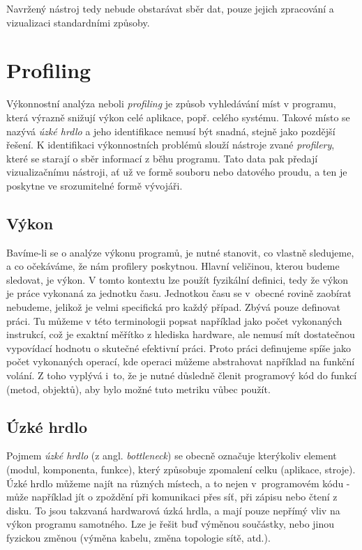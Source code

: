 \documentclass[czech,BP]{thesiskiv}
\begin{document}
Navržený nástroj tedy nebude obstarávat sběr dat, pouze jejich zpracování a vizualizaci standardními způsoby.

\newpage

\chapter{Profiling}

Výkonnostní analýza neboli \emph{profiling} je způsob vyhledávání míst v programu, která výrazně snižují výkon celé aplikace, popř. celého systému. Takové místo se nazývá \emph{úzké hrdlo} a jeho identifikace nemusí být snadná, stejně jako pozdější řešení. K identifikaci výkonnostních problémů slouží nástroje zvané \emph{profilery}, které se starají o sběr informací z běhu programu. Tato data pak předají vizualizačnímu nástroji, ať už ve formě souboru nebo datového proudu, a ten je poskytne ve srozumitelné formě vývojáři.

\section{Výkon}

Bavíme-li se o analýze výkonu programů, je nutné stanovit, co vlastně sledujeme, a co očekáváme, že nám profilery poskytnou. Hlavní veličinou, kterou budeme sledovat, je výkon. V tomto kontextu lze použít fyzikální definici, tedy že výkon je práce vykonaná za jednotku času. Jednotkou času se v~obecné rovině zaobírat nebudeme, jelikož je velmi specifická pro každý případ. Zbývá pouze definovat práci. Tu můžeme v této terminologii popsat například jako počet vykonaných instrukcí, což je exaktní měřítko z hlediska hardware, ale nemusí mít dostatečnou vypovídací hodnotu o skutečné efektivní práci. Proto práci definujeme spíše jako počet vykonaných operací, kde operaci můžeme abstrahovat například na funkční volání. Z toho vyplývá i~to, že je nutné důsledně členit programový kód do funkcí (metod, objektů), aby bylo možné tuto metriku vůbec použít.

\section{Úzké hrdlo}

Pojmem \emph{úzké hrdlo} (z angl. \emph{bottleneck}) se obecně označuje kterýkoliv element (modul, komponenta, funkce), který způsobuje zpomalení celku (aplikace, stroje). Úzké hrdlo můžeme najít na různých místech, a to nejen v~programovém kódu - může například jít o zpoždění při komunikaci přes síť, při zápisu nebo čtení z disku. To jsou takzvaná hardwarová úzká hrdla, a mají pouze nepřímý vliv na výkon programu samotného. Lze je řešit buď výměnou součástky, nebo jinou fyzickou změnou (výměna kabelu, změna topologie sítě, atd.).
\end{document}

